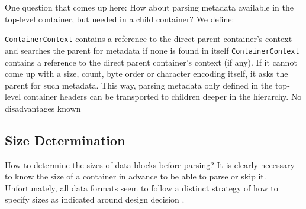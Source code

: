 One question that comes up here: How about parsing metadata available in the top-level container, but needed in a child container? We define:

{%
\texttt{ContainerContext} contains a reference to the direct parent container's context and searches the parent for metadata if none is found in itself
}
{%
\texttt{ContainerContext} contains a reference to the direct parent container's context (if any). If it cannot come up with a size, count, byte order or character encoding itself, it asks the parent for such metadata.
}
{%
This way, parsing metadata only defined in the top-level container headers can be transported to children deeper in the hierarchy.
}
{%
No disadvantages known
}

\subsection{Size Determination}%
\label{sec:SizeDetermination}%

How to determine the sizes of data blocks before parsing? It is clearly necessary to know the size of a container in advance to be able to parse or skip it. Unfortunately, all data formats seem to follow a distinct strategy of how to specify sizes as indicated around design decision .

